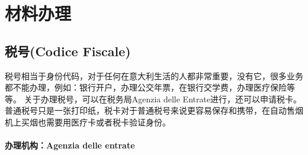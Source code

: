 
% 


\chapter{材料办理}                 


\section{税号(Codice Fiscale)}
税号相当于身份代码，对于任何在意大利生活的人都非常重要，没有它，很多业务都不能办理，例如：银行开户，办理公交年票，在银行交学费，办理医疗保险等等。
关于办理税号，可以在税务局Agenzia delle Entrate进行，还可以申请税卡。普通税号只是一张打印纸，税卡对于普通税号来说更容易保存和携带，在自动售烟机上买烟也需要用医疗卡或者税卡验证身份。


\subsubsection{办理机构：Agenzia delle entrate}

